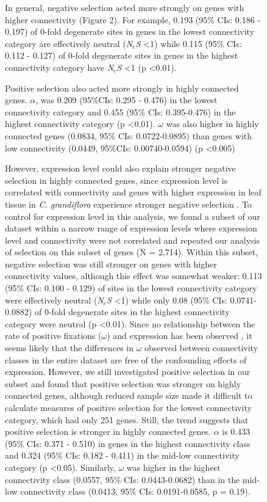 \begin{figure}[ht!]
In general, negative selection acted more strongly on genes with higher connectivity (Figure 2). For example, 0.193 (95\% CIs: 0.186 - 0.197) of 0-fold degenerate sites in genes in the lowest connectivity category are effectively neutral (\textit{N$_{e}$S} \textless 1) while 0.115 (95\% CIs: 0.112 - 0.127) of 0-fold degenerate sites in genes in the highest connectivity category have \textit{N$_{e}$S} \textless 1 (p \textless 0.01). 

Positive selection also acted more strongly in highly connected genes. $\alpha$, was 0.209 (95\%CIs: 0.295 - 0.476) in the lowest connectivity category and 0.455 (95\% CIs: 0.395-0.476) in the highest connectivity category (p \textless 0.01). $\omega$ was also higher in highly connected genes (0.0834, 95\% CIs: 0.0722-0.0895) than genes with low connectivity (0.0449, 95\%CIs: 0.00740-0.0594) (p \textless 0.005)

However, expression level could also explain stronger negative selection in highly connected genes, since expression level is correlated with connectivity and genes with higher expression in leaf tissue in \textit{C. grandiflora} experience stronger negative selection \citep{Williamson2014-tf}. To control for expression level in this analysis, we found a subset of our dataset within a narrow range of expression levels where expression level and connectivity were not correlated and repeated our analysis of selection on this subset of genes (N = 2,714). Within this subset, negative selection was still stronger on genes with higher connectivity values, although this effect was somewhat weaker: 0.113 (95\% CIs: 0.100 - 0.129) of sites in the lowest connectivity category were effectively neutral (\textit{N$_{e}$S} \textless 1) while only 0.08 (95\% CIs: 0.0741-0.0882) of 0-fold degenerate sites in the highest connectivity category were neutral (p \textless 0.01). 
Since no relationship between the rate of positive fixations ($\omega$) and expression has been observed \citep{Williamson2014-tf}, it seems likely that the differences in $\omega$ observed between connectivity classes in the entire dataset are free of the confounding effects of expression. However, we still investigated positive selection in our subset and found that positive selection was stronger on highly connected genes, although reduced sample size made it difficult to calculate measures of positive selection for the lowest connectivity category, which had only 251 genes. Still, the trend suggests that positive selection is stronger in highly connected genes. $\alpha$ is 0.433 (95\% CIs: 0.371 - 0.510) in genes in the highest connectivity class and 0.324 (95\% CIs: 0.182 - 0.411) in the mid-low connectivity category (p \textless 0.05). Similarly, $\omega$ was higher in the highest connectivity class (0.0557, 95\% CIs: 0.0443-0.0682) than in the mid-low connectivity class (0.0413, 95\% CIs: 0.0191-0.0585, p = 0.19). 



\end{figure}
